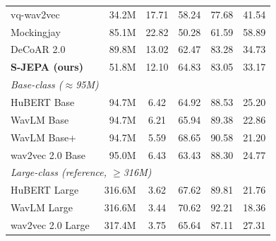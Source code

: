 \documentclass[9pt,twocolumn]{article}
\theoremstyle{plain}
\theoremstyle{definition}
\theoremstyle{remark}
\begin{document}
\begin{table}[t]
\begin{tabular}{l@{\hspace{1em}}r@{\hspace{1.5em}}c@{\hspace{1em}}c@{\hspace{1em}}c@{\hspace{1em}}c}
vq-wav2vec~\citep{baevski2019vqwav2vec}         & \phantom{0}34.2M & 17.71 & 58.24 & 77.68 & 41.54 \\
Mockingjay~\citep{liu2020mockingjay}            & \phantom{0}85.1M & 22.82 & 50.28 & 61.59 & 58.89 \\
DeCoAR 2.0~\citep{ling2020decoar2}              & \phantom{0}89.8M & 13.02 & 62.47 & 83.28 & 34.73 \\
\textbf{S-JEPA (ours)}                          & \phantom{0}51.8M & \phantom{0}12.10 & 64.83 & 83.05 & 33.17 \\
\midrule
\multicolumn{6}{l}{\textit{Base-class ($\approx$95M)}} \\
\midrule
HuBERT Base~\citep{hsu2021hubert}               & \phantom{0}94.7M & \phantom{0}6.42 & 64.92 & 88.53 & 25.20 \\
WavLM Base~\citep{chen2022wavlm}                & \phantom{0}94.7M & \phantom{0}6.21 & 65.94 & 89.38 & 22.86 \\
WavLM Base+~\citep{chen2022wavlm}               & \phantom{0}94.7M & \phantom{0}5.59 & 68.65 & 90.58 & 21.20 \\
wav2vec 2.0 Base~\citep{baevski2020wav2vec}    & \phantom{0}95.0M & \phantom{0}6.43 & 63.43 & 88.30 & 24.77 \\
\midrule
\multicolumn{6}{l}{\textit{Large-class (reference, $\geq$316M)}} \\
\midrule
HuBERT Large~\citep{hsu2021hubert}              & 316.6M           & \phantom{0}3.62 & 67.62 & 89.81 & 21.76 \\
WavLM Large~\citep{chen2022wavlm}               & 316.6M           & \phantom{0}3.44 & 70.62 & 92.21 & 18.36 \\
wav2vec 2.0 Large~\citep{baevski2020wav2vec}   & 317.4M           & \phantom{0}3.75 & 65.64 & 87.11 & 27.31 \\
\bottomrule
\end{tabular}
\end{table}
\end{document}
